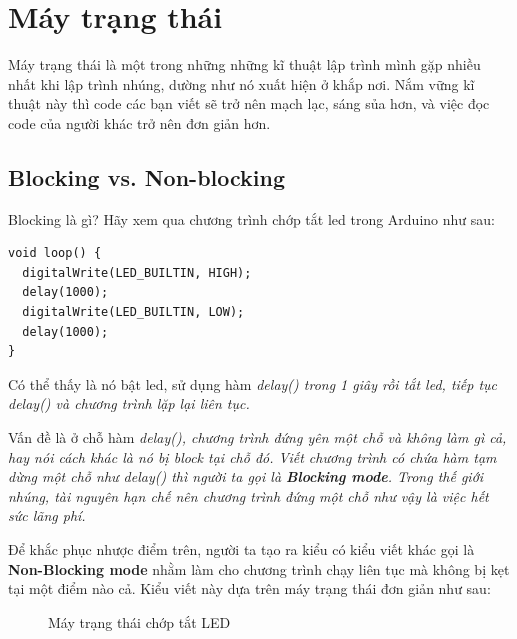 \chapter{Máy trạng thái}

Máy trạng thái là một trong những những kĩ thuật lập trình mình gặp nhiều nhất khi lập trình nhúng, dường như nó xuất hiện ở khắp nơi. Nắm vững kĩ thuật này thì code các bạn viết sẽ trở nên mạch lạc, sáng sủa hơn, và việc đọc code của người khác trở nên đơn giản hơn.
\newpage

\section{Blocking vs. Non-blocking}

Blocking là gì? Hãy xem qua chương trình chớp tắt led trong Arduino như sau:
\begin{lstlisting}
void loop() {
  digitalWrite(LED_BUILTIN, HIGH);   
  delay(1000);                       
  digitalWrite(LED_BUILTIN, LOW);    
  delay(1000);                       
}
\end{lstlisting}

Có thể thấy là nó bật led, sử dụng hàm \it{delay()} trong 1 giây rồi tắt led, tiếp tục \it{delay()} và chương trình lặp lại liên tục.

Vấn đề là ở chỗ hàm \it{delay()}, chương trình đứng yên một chỗ và không làm gì cả, hay nói cách khác là nó bị \it{block} tại chỗ đó. Viết chương trình có chứa hàm tạm dừng một chỗ như \it{delay()} thì người ta gọi là \textbf{Blocking mode}. Trong thế giới nhúng, tài nguyên hạn chế nên chương trình đứng một chỗ như vậy là việc hết sức lãng phí. 

Để khắc phục nhược điểm trên, người ta tạo ra kiểu có kiểu viết khác gọi là \textbf{Non-Blocking mode} nhằm làm cho chương trình chạy liên tục mà không bị kẹt tại một điểm nào cả. Kiểu viết này dựa trên máy trạng thái đơn giản như sau:

\begin{figure}[h!]
	\centering
{}
\caption{Máy trạng thái chớp tắt LED}
\end{figure}

